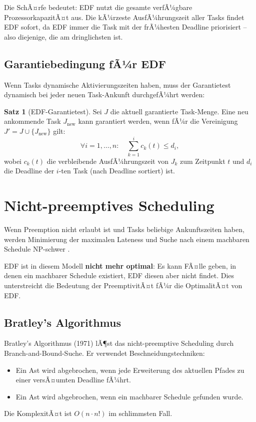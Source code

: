 ﻿\documentclass[a4paper,12pt]{report}
\theoremstyle{definition}
\newtheorem{satz}{Satz}[chapter]
\begin{document}
Die SchÃ¤rfe bedeutet: EDF nutzt die gesamte verfÃ¼gbare ProzessorkapazitÃ¤t aus.
Die kÃ¼rzeste AusfÃ¼hrungszeit aller Tasks findet EDF sofort, da EDF immer die Task
mit der frÃ¼hesten Deadline priorisiert -- also diejenige, die am dringlichsten ist.

\subsection{Garantiebedingung fÃ¼r EDF}

Wenn Tasks dynamische Aktivierungszeiten haben, muss der Garantietest
dynamisch bei jeder neuen Task-Ankunft durchgefÃ¼hrt werden:

\begin{satz}[EDF-Garantietest]
	Sei $J$ die aktuell garantierte Task-Menge. Eine neu ankommende Task $J_{\text{new}}$
	kann garantiert werden, wenn fÃ¼r die Vereinigung $J' = J \cup \{J_{\text{new}}\}$
	gilt:
	\[
		\forall i = 1, \ldots, n: \quad \sum_{k=1}^{i} c_k(t) \leq d_i,
	\]
	wobei $c_k(t)$ die verbleibende AusfÃ¼hrungszeit von $J_k$ zum Zeitpunkt $t$ und
	$d_i$ die Deadline der $i$-ten Task (nach Deadline sortiert) ist.
\end{satz}

\section{Nicht-preemptives Scheduling}

Wenn Preemption nicht erlaubt ist und Tasks beliebige Ankunftszeiten haben,
werden Minimierung der maximalen Lateness und Suche nach einem machbaren Schedule
NP-schwer \cite{Buttazzo2011}.

EDF ist in diesem Modell \textbf{nicht mehr optimal}: Es kann FÃ¤lle geben, in
denen ein machbarer Schedule existiert, EDF diesen aber nicht findet. Dies
unterstreicht die Bedeutung der PreemptivitÃ¤t fÃ¼r die OptimalitÃ¤t von EDF.

\subsection{Bratley's Algorithmus}

Bratley's Algorithmus (1971) lÃ¶st das nicht-preemptive Scheduling durch
Branch-and-Bound-Suche. Er verwendet Beschneidungstechniken:
\begin{itemize}
	\item Ein Ast wird abgebrochen, wenn jede Erweiterung des aktuellen Pfades
	      zu einer versÃ¤umten Deadline fÃ¼hrt.
	\item Ein Ast wird abgebrochen, wenn ein machbarer Schedule gefunden wurde.
\end{itemize}
Die KomplexitÃ¤t ist $O(n \cdot n!)$ im schlimmsten Fall.
\end{document}
